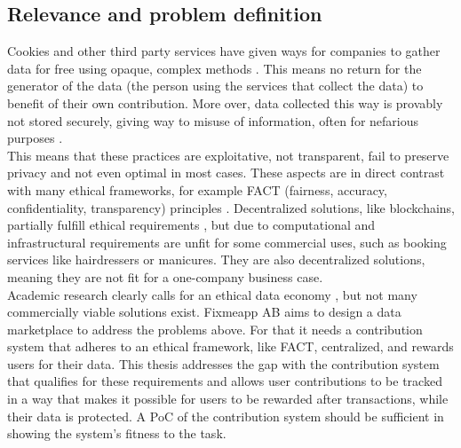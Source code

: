 \documentclass[english, 12pt, a4paper, sci, utf8, a-2b, online]{aaltothesis}
\theoremstyle{change}
\theoremstyle{theoremstyle}
\begin{document}
\subsection{Relevance and problem definition}
Cookies and other third party services have given ways for companies to gather data for free using opaque, complex methods \cite{altaweel2015web}\cite{demir2022towards}\cite{narayanan2017princeton}\cite{veale2022adtech}. This means no return for the generator of the data (the person using the services that collect the data) to benefit of their own contribution. More over, data collected this way is provably not stored securely, giving way to misuse of information, often for nefarious purposes \cite{langvardt2024media}\cite{cross2025examining}.\\
This means that these practices are exploitative, not transparent, fail to preserve privacy and not even optimal in most cases. These aspects are in direct contrast with many ethical frameworks, for example FACT (fairness, accuracy, confidentiality, transparency) principles \cite{sohail2024data}. Decentralized solutions, like blockchains, partially fulfill ethical requirements \cite{sansone2023blockchain}, but due to computational and infrastructural requirements are unfit for some commercial uses, such as booking services like hairdressers or manicures. They are also decentralized solutions, meaning they are not fit for a one-company business case.\\
Academic research clearly calls for an ethical data economy \cite{koskinen2019if}\cite{koskinen2023ethical}\cite{rantanen2020ethical}\cite{rantanen2020humans}, but not many commercially viable solutions exist. Fixmeapp AB aims to design a data marketplace to address the problems above. For that it needs a contribution system that adheres to an ethical framework, like FACT, centralized, and rewards users for their data. This thesis addresses the gap with the contribution system that qualifies for these requirements and allows user contributions to be tracked in a way that makes it possible for users to be rewarded after transactions, while their data is protected. A PoC of the contribution system should be sufficient in showing the system's fitness to the task.

\clearpage
\end{document}
